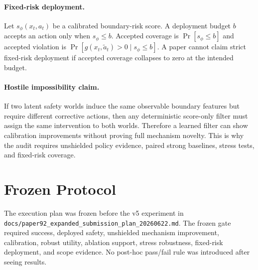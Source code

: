 \documentclass{article}
\begin{document}
\paragraph{Fixed-risk deployment.} Let $s_\phi(x_t,a_t)$ be a calibrated boundary-risk score. A deployment budget $b$ accepts an action only when $s_\phi\leq b$. Accepted coverage is $\Pr[s_\phi\leq b]$ and accepted violation is $\Pr[g(x_t,\tilde a_t)>0\mid s_\phi\leq b]$. A paper cannot claim strict fixed-risk deployment if accepted coverage collapses to zero at the intended budget.

\paragraph{Hostile impossibility claim.} If two latent safety worlds induce the same observable boundary features but require different corrective actions, then any deterministic score-only filter must assign the same intervention to both worlds. Therefore a learned filter can show calibration improvements without proving full mechanism novelty. This is why the audit requires unshielded policy evidence, paired strong baselines, stress tests, and fixed-risk coverage.

\section{Frozen Protocol}
The execution plan was frozen before the v5 experiment in \texttt{docs/paper92\_expanded\_submission\_plan\_20260622.md}. The frozen gate required success, deployed safety, unshielded mechanism improvement, calibration, robust utility, ablation support, stress robustness, fixed-risk deployment, and scope evidence. No post-hoc pass/fail rule was introduced after seeing results.
\end{document}
